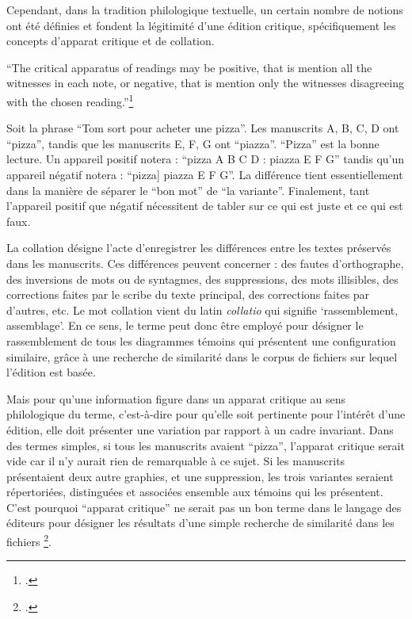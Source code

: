 Cependant, dans la tradition philologique textuelle, un certain nombre
de notions ont été définies et fondent la légitimité d'une édition
critique, spécifiquement les concepts d'apparat critique et de
collation.

\begin{kwote}
``The critical apparatus of readings may be positive, that is mention
all the witnesses in each note, or negative, that is mention only the
witnesses disagreeing with the chosen reading.''\footcite[p.348]{moureau_apparatus_2015}
\end{kwote}

Soit la phrase ``Tom sort pour acheter une pizza''. Les manuscrits A, B,
C, D ont ``pizza'', tandis que les manuscrits E, F, G ont ``piazza''.
``Pizza'' est la bonne lecture. Un appareil positif notera : ``pizza A B
C D : piazza E F G'' tandis qu'un appareil négatif notera : ``pizza{]}
piazza E F G''. La différence tient essentiellement dans la manière de
séparer le ``bon mot'' de ``la variante''. Finalement, tant l'appareil
positif que négatif nécessitent de tabler sur ce qui est juste et ce qui
est faux.

La collation désigne l'acte d'enregistrer les différences entre les
textes préservés dans les manuscrits. Ces différences peuvent concerner
: des fautes d'orthographe, des inversions de mots ou de syntagmes, des
suppressions, des mots illisibles, des corrections faites par le scribe
du texte principal, des corrections faites par d'autres, etc. Le mot
collation vient du latin \textit{collatio} qui signifie `rassemblement,
assemblage'. En ce sens, le terme peut donc être employé pour désigner
le rassemblement de tous les diagrammes témoins qui présentent une
configuration similaire, grâce à une recherche de similarité dans le
corpus de fichiers \svgs sur lequel l'édition est basée.

Mais pour qu'une information figure dans un apparat critique au sens
philologique du terme, c'est-à-dire pour qu'elle soit pertinente pour
l'intérêt d'une édition, elle doit présenter une variation par rapport à
un cadre invariant. Dans des termes simples, si tous les manuscrits
avaient ``pizza'', l'apparat critique serait vide car il n'y aurait rien de
remarquable à ce sujet. Si les manuscrits présentaient deux autre
graphies, et une suppression, les trois variantes seraient répertoriées,
distinguées et associées ensemble aux témoins qui les présentent. C'est
pourquoi ``apparat critique'' ne serait pas un bon terme dans le
langage des éditeurs pour désigner les résultats d'une simple recherche
de similarité dans les fichiers \svgs\footcite[PAGE]{trovato_everything_2014}.

